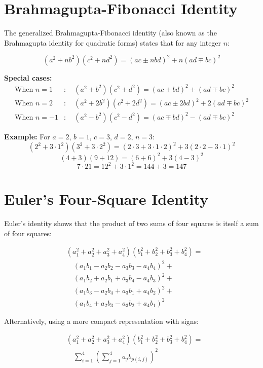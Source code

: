 \section{Brahmagupta-Fibonacci Identity}

The generalized Brahmagupta-Fibonacci identity (also known as the Brahmagupta identity for quadratic forms) states that for any integer \(n\):

\[
(a^2 + nb^2)(c^2 + nd^2) = (ac \pm nbd)^2 + n(ad \mp bc)^2
\]

\textbf{Special cases:}
\begin{align}
\text{When } n = 1&: \quad (a^2 + b^2)(c^2 + d^2) = (ac \pm bd)^2 + (ad \mp bc)^2 \\
\text{When } n = 2&: \quad (a^2 + 2b^2)(c^2 + 2d^2) = (ac \pm 2bd)^2 + 2(ad \mp bc)^2 \\
\text{When } n = -1&: \quad (a^2 - b^2)(c^2 - d^2) = (ac \mp bd)^2 - (ad \mp bc)^2
\end{align}

\textbf{Example:} For \(a = 2\), \(b = 1\), \(c = 3\), \(d = 2\), \(n = 3\):
\[
(2^2 + 3 \cdot 1^2)(3^2 + 3 \cdot 2^2) = (2 \cdot 3 + 3 \cdot 1 \cdot 2)^2 + 3(2 \cdot 2 - 3 \cdot 1)^2
\]
\[
(4 + 3)(9 + 12) = (6 + 6)^2 + 3(4 - 3)^2
\]
\[
7 \cdot 21 = 12^2 + 3 \cdot 1^2 = 144 + 3 = 147
\]


\section{Euler's Four-Square Identity}

Euler's identity shows that the product of two sums of four squares is itself a sum of four squares:

\[
\begin{aligned}
&(a_1^2 + a_2^2 + a_3^2 + a_4^2)(b_1^2 + b_2^2 + b_3^2 + b_4^2) = \\
&\quad (a_1b_1 - a_2b_2 - a_3b_3 - a_4b_4)^2 + \\
&\quad (a_1b_2 + a_2b_1 + a_3b_4 - a_4b_3)^2 + \\
&\quad (a_1b_3 - a_2b_4 + a_3b_1 + a_4b_2)^2 + \\
&\quad (a_1b_4 + a_2b_3 - a_3b_2 + a_4b_1)^2
\end{aligned}
\]

Alternatively, using a more compact representation with signs:

\[
\begin{aligned}
&(a_1^2 + a_2^2 + a_3^2 + a_4^2)(b_1^2 + b_2^2 + b_3^2 + b_4^2) = \\
&\quad \sum_{i=1}^4 \left( \sum_{j=1}^4 a_j b_{p(i,j)} \right)^2
\end{aligned}
\]

